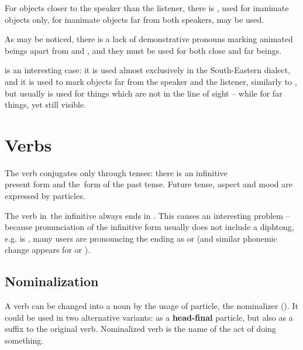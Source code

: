 For objects closer to the speaker than the listener, there is , used
for inanimate objects only, for inanimate objects far from both speakers,
 may be used.

As may be noticed, there is a lack of demonstrative pronouns marking animated
beings apart from  and , and they must be used for both
close and far beings.


 is an interesting case: it is used almost exclusively in the
South-Eastern dialect, and it is used to mark objects far from the speaker and
the listener, similarly to , but usually is used for things which
are not in the line of sight -- while  for far things, yet still
visible.

\section{Verbs}
\label{sec:morph-verbs}

The verb conjugates only through tenses: there is an infinitive\\present form and
the~form of the past tense. Future tense, aspect and mood are expressed by
particles.

The verb in~the infinitive always ends in . This causes an interesting
problem -- because pronunciation of the infinitive form usually does not include
a diphtong, e.g.  is , many users are
pronouncing the ending  as  or  (and similar phonemic
change appears for  or ).



\subsection{Nominalization}

A verb can be changed into a noun by the usage of  particle, the
nominalizer (\Nmlz{}). It could be used in two alternative variants: as a
\textbf{head-final} particle, but also as a suffix to the original verb.
Nominalized verb is the name of the act of doing something.

